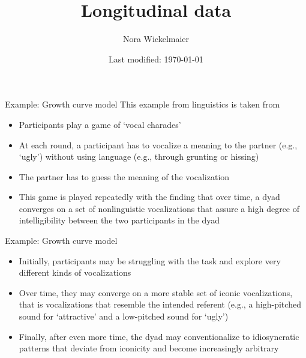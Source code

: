 \documentclass[aspectratio=169]{beamer}
\title{Longitudinal data}
\author{Nora Wickelmaier}
\date{Last modified: \today}
\begin{document}
\begin{frame}{}
\thispagestyle{empty}
\titlepage
\end{frame}



\begin{frame}{Example: Growth curve model}
This example from linguistics is taken from \citet{Winter2016}\\[2ex]
\begin{itemize}
  \item Participants play a game of `vocal charades'
  \item At each round, a participant has to vocalize a meaning to the
  partner (e.g., `ugly') without using language (e.g., through grunting or
  hissing)
  \item The partner has to guess the meaning of the vocalization
  \item This game is played repeatedly with the finding that over time, a
  dyad converges on a set of nonlinguistic vocalizations that assure a high
  degree of intelligibility between the two participants in the dyad
\end{itemize}
\end{frame}


\begin{frame}{Example: Growth curve model}
\begin{itemize}
  \item Initially, participants may be struggling with the task and explore
  very different kinds of vocalizations
  \item Over time, they may converge on a more stable set of iconic
  vocalizations, that is vocalizations that resemble the intended referent
  (e.g., a high-pitched sound for `attractive' and a low-pitched sound for
  `ugly')
  \item Finally, after even more time, the dyad may conventionalize to
  idiosyncratic patterns that deviate from iconicity and become
  increasingly arbitrary
\end{itemize}
\end{frame}
\end{document}
